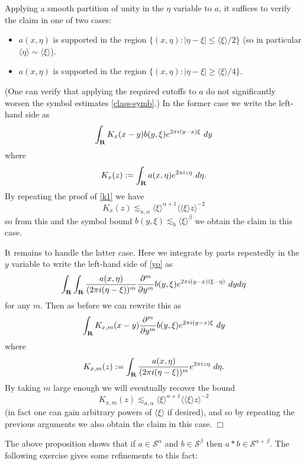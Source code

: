 \documentclass[11pt]{article}
\theoremstyle{definition}
\begin{document}
Applying a smooth partition of unity in the \({\eta}\) variable to \({a}\), it suffices to verify the claim in one of two cases: 
\begin{itemize}

\item \({a(x,\eta)}\) is supported in the region \({\{ (x,\eta): |\eta - \xi| \leq \langle \xi \rangle/2 \}}\) (so in particular \({\langle \eta \rangle \sim \langle \xi \rangle}\)). 
\item \({a(x,\eta)}\) is supported in the region \({\{ (x,\eta): |\eta - \xi| \geq \langle \xi \rangle/4 \}}\).


\end{itemize}
 (One can verify that applying the required cutoffs to \({a}\) do not significantly worsen the symbol estimates \eqref{class-symb}.) In the former case we write the left-hand side as 
\[\displaystyle  \int_{\bf R} K_x(x-y) b(y,\xi) e^{2\pi i (y-x)\xi}\ dy\]
 where 
\[\displaystyle  K_x(z) := \int_{\bf R} a(x,\eta) e^{2\pi i z \eta}\ d\eta.\]
 By repeating the proof of \eqref{k1} we have 
\[\displaystyle  K_x(z) \lesssim_{a,\alpha} \langle \xi \rangle^{\alpha+1} \langle \langle \xi \rangle z \rangle^{-2}\]
 so from this and the symbol bound \({b(y,\xi) \lesssim_b \langle \xi\rangle^\beta}\) we obtain the claim in this case.

It remains to handle the latter case. Here we integrate by parts repeatedly in the \({y}\) variable to write the left-hand side of \eqref{yo} as 
\[\displaystyle  \int_{\bf R} \int_{\bf R} \frac{a(x,\eta)}{(2\pi i(\eta-\xi))^m} \frac{\partial^m}{\partial y^m} b(y,\xi) e^{2\pi i (y-x)(\xi-\eta)}\ dy d\eta\]
 for any \({m}\). Then as before we can rewrite this as 
\[\displaystyle  \int_{\bf R} K_{x,m}(x-y) \frac{\partial^m}{\partial y^m} b(y,\xi) e^{2\pi i (y-x)\xi}\ dy\]
 where 
\[\displaystyle  K_{x,m}(z) := \int_{\bf R} \frac{a(x,\eta)}{(2\pi i(\eta-\xi))^m} e^{2\pi i z \eta}\ d\eta.\]
 By taking \({m}\) large enough we will eventually recover the bound 
\[\displaystyle  K_{x,m}(z) \lesssim_{a,\alpha} \langle \xi \rangle^{\alpha+1} \langle \langle \xi \rangle z \rangle^{-2}\]
 (in fact one can gain arbitrary powers of \({\langle \xi \rangle}\) if desired), and so by repeating the previous arguments we also obtain the claim in this case. \(\Box\)

The above proposition shows that if \({a \in {\mathcal S}^\alpha}\) and \({b \in {\mathcal S}^\beta}\) then \({a \ast b \in {\mathcal S}^{\alpha+\beta}}\). The following exercise gives some refinements to this fact:
\end{document}
